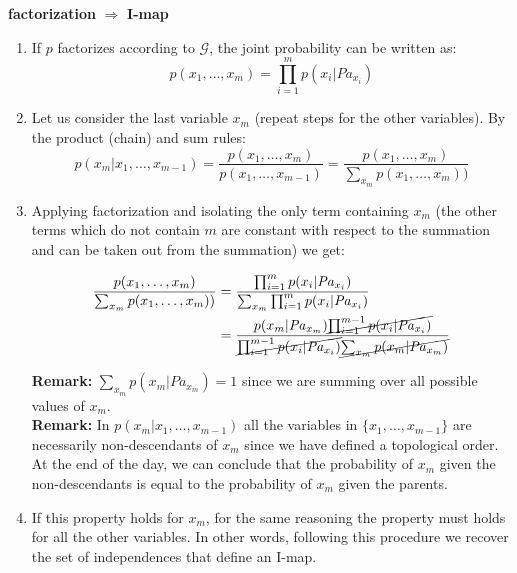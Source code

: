 \textbf{factorization} $\Rightarrow$ \textbf{I-map}
\begin{enumerate}
	\item If $p$ factorizes according to $\mathcal{G}$, the joint probability can
		be written as:
		\[
			p(x_{1}, \hdots, x_{m}) = \prod_{i=1}^{m}p(x_{i}| \mathit{Pa}_{x_i})
		\]

	\item Let us consider the last variable $x_{m}$ (repeat steps for the other
		variables). By the product (chain) and sum rules:
		\[
			p(x_{m}|x_{1}, \hdots, x_{m-1}) = \frac{p(x_{1}, \hdots, x_{m})}{p(x_{1},
			\hdots, x_{m-1})}= \frac{p(x_{1}, \hdots, x_{m})}{\sum_{x_m}p(x_{1},
			\hdots, x_{m}))}
		\]

	\item Applying factorization and isolating the only term containing $x_{m}$ (the
		other terms which do not contain $m$ are constant with respect to the
		summation and can be taken out from the summation) we get:

		\begin{align*}
			\frac{p(x_{1}, \hdots, x_{m})}{\sum_{x_m}p(x_{1}, \hdots, x_{m}))} & = \frac{\prod_{i=1}^{m}p(x_{i}| \mathit{Pa}_{x_i})}{\sum_{x_m}\prod_{i=1}^{m}p(x_{i}| \mathit{Pa}_{x_i})}                                                                                     \\
			                                                                   & = \frac{p(x_{m}| \mathit{Pa}_{x_m}) \cancel{\prod_{i=1}^{m-1} p(x_i|\mathit{Pa}_{x_i})}}{\cancel{\prod_{i=1}^{m-1} p(x_i | \mathit{Pa}_{x_i})} \cancel{\sum_{x_m}p(x_m | \mathit{Pa}_{x_m})}}
		\end{align*}

		\textbf{Remark:} $\sum_{x_m}p(x_{m}| \mathit{Pa}_{x_m})=1$ since we are summing
		over all possible values of $x_{m}$.\\ \textbf{Remark:} In
		$p(x_{m}| x_{1}, \hdots, x_{m-1})$ all the variables in
		$\{x_{1}, \hdots, x_{m-1}\}$ are necessarily non-descendants of $x_{m}$
		since we have defined a topological order.\\ At the end of the day, we can conclude
		that the probability of $x_{m}$ given the non-descendants is equal to the probability
		of $x_{m}$ given the parents.

	\item If this property holds for $x_{m}$, for the same reasoning the property
		must holds for all the other variables. In other words, following this
		procedure we recover the set of independences that define an I-map.
\end{enumerate}

